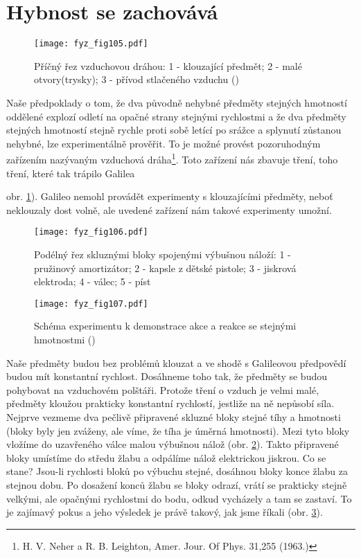 {  \section{Hybnost se zachovává}
    
    \begin{figure}[ht!]  %
      \centering
      \texttt{[image: fyz\_fig105.pdf]}
      \caption{Příčný řez vzduchovou dráhou: 1 - klouzající předmět; 2 - malé otvory(trysky); 3 -  
               přívod stlačeného vzduchu (\cite[s.~143]{Feynman01})}
      \label{fyz:fig105}
    \end{figure}
    Naše předpoklady o tom, že dva původně nehybné předměty stejných hmotností oddělené explozí 
    odletí na opačné strany stejnými rychlostmi a že dva předměty stejných hmotností stejně rychle 
    proti sobě letící po srážce a splynutí zůstanou nehybné, lze experimentálně prověřit. To je 
    možné provést pozoruhodným zařízením nazývaným vzduchová dráha\footnote{H. V. Neher a R. B. 
    Leighton, Amer. Jour. Of Phys. 31,255 (1963.)}. Toto zařízení nás zbavuje tření, toho tření, 
    které tak trápilo Galilea {obr. \ref{fyz:fig105}). Galileo nemohl provádět experimenty s 
    klouzajícími předměty, neboť neklouzaly dost volně, ale uvedené zařízení nám takové experimenty 
    umožní.

    \begin{figure}[ht!]  %
      \centering
      \texttt{[image: fyz\_fig106.pdf]}
      \caption{Podélný řez skluznými bloky spojenými výbušnou náloží: 1 - pružinový amortizátor; 2 - kapsle 
               z dětské pistole; 3 - jiskrová elektroda; 4 - válec; 5 - píst      
                \cite[s.~144]{Feynman01}}
       \label{fyz:fig106}     
    \end{figure}

    \begin{figure}[ht!]  %
      \centering
      \texttt{[image: fyz\_fig107.pdf]}
      \caption{Schéma experimentu k demonstrace akce a reakce se stejnými hmotnostmi  
               (\cite[s.~144]{Feynman01})}
      \label{fyz:fig107}
    \end{figure}
    Naše předměty budou bez problémů klouzat a ve shodě s Galileovou předpovědí budou mít 
    konstantní rychlost. Dosáhneme toho tak, že předměty se budou pohybovat na vzduchovém polštáři. 
    Protože tření o vzduch je velmi malé, předměty kloužou prakticky konstantní rychlostí, jestliže 
    na ně nepůsobí síla. Nejprve vezmeme dva pečlivě připravené skluzné bloky stejné tíhy a 
    hmotnosti (bloky byly jen zváženy, ale víme, že tíha je úměrná hmotnosti). Mezi tyto bloky 
    vložíme do uzavřeného válce malou výbušnou nálož (obr. \ref{fyz:fig106}). Takto připravené 
    bloky umístíme do středu žlabu a odpálíme nálož elektrickou jiskrou. Co se stane? Jsou-li 
    rychlosti bloků po výbuchu stejné, dosáhnou bloky konce žlabu za stejnou dobu. Po dosažení 
    konců žlabu se bloky odrazí, vrátí se prakticky stejně velkými, ale opačnými rychlostmi 
    do bodu, odkud vycházely a tam se zastaví. To je zajímavý pokus a jeho výsledek je právě 
    takový, jak jsme říkali (obr. \ref{fyz:fig107}).

}}
